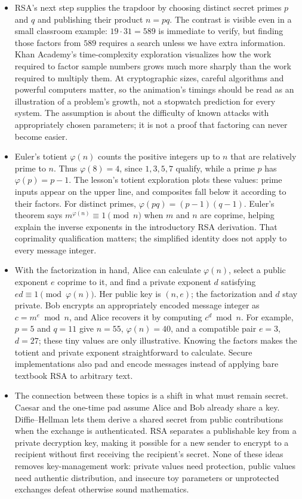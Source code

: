 \documentclass[10pt]{article}
\begin{document}
\begin{itemize}[leftmargin=1.25em, itemsep=0.3em, parsep=0pt, topsep=0pt]
    \item RSA's next step supplies the trapdoor by choosing distinct secret primes \(p\) and \(q\) and publishing their product \(n=pq\). The contrast is visible even in a small classroom example: \(19\cdot31=589\) is immediate to verify, but finding those factors from \(589\) requires a search unless we have extra information. Khan Academy's time-complexity exploration visualizes how the work required to factor sample numbers grows much more sharply than the work required to multiply them. At cryptographic sizes, careful algorithms and powerful computers matter, so the animation's timings should be read as an illustration of a problem's growth, not a stopwatch prediction for every system. The assumption is about the difficulty of known attacks with appropriately chosen parameters; it is not a proof that factoring can never become easier.

    \item Euler's totient \(\varphi(n)\) counts the positive integers up to \(n\) that are relatively prime to \(n\). Thus \(\varphi(8)=4\), since \(1,3,5,7\) qualify, while a prime \(p\) has \(\varphi(p)=p-1\). The lesson's totient exploration plots these values: prime inputs appear on the upper line, and composites fall below it according to their factors. For distinct primes, \(\varphi(pq)=(p-1)(q-1)\). Euler's theorem says \(m^{\varphi(n)}\equiv1\pmod n\) when \(m\) and \(n\) are coprime, helping explain the inverse exponents in the introductory RSA derivation. That coprimality qualification matters; the simplified identity does not apply to every message integer.

    \item With the factorization in hand, Alice can calculate \(\varphi(n)\), select a public exponent \(e\) coprime to it, and find a private exponent \(d\) satisfying \(ed\equiv1\pmod{\varphi(n)}\). Her public key is \((n,e)\); the factorization and \(d\) stay private. Bob encrypts an appropriately encoded message integer as \(c=m^e\bmod n\), and Alice recovers it by computing \(c^d\bmod n\). For example, \(p=5\) and \(q=11\) give \(n=55\), \(\varphi(n)=40\), and a compatible pair \(e=3\), \(d=27\); these tiny values are only illustrative. Knowing the factors makes the totient and private exponent straightforward to calculate. Secure implementations also pad and encode messages instead of applying bare textbook RSA to arbitrary text.

    \item The connection between these topics is a shift in what must remain secret. Caesar and the one-time pad assume Alice and Bob already share a key. Diffie--Hellman lets them derive a shared secret from public contributions when the exchange is authenticated. RSA separates a publishable key from a private decryption key, making it possible for a new sender to encrypt to a recipient without first receiving the recipient's secret. None of these ideas removes key-management work: private values need protection, public values need authentic distribution, and insecure toy parameters or unprotected exchanges defeat otherwise sound mathematics.
\end{itemize}
\end{document}
